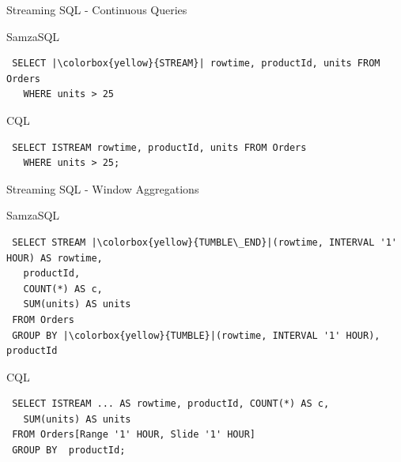 \documentclass[newPxFont]{beamer}
\begin{document}

\begin{frame}[fragile]{Streaming SQL - Continuous Queries}

\begin{alertblock}{SamzaSQL}
 \begin{verbatim}
 SELECT |\colorbox{yellow}{STREAM}| rowtime, productId, units FROM Orders 
   WHERE units > 25
 \end{verbatim}
\end{alertblock}

\begin{exampleblock}{CQL}
 \begin{verbatim}
 SELECT ISTREAM rowtime, productId, units FROM Orders 
   WHERE units > 25;
 \end{verbatim}
\end{exampleblock}
\end{frame}


\begin{frame}[fragile]{Streaming SQL - Window Aggregations}

\begin{alertblock}{SamzaSQL}
 \begin{verbatim}
 SELECT STREAM |\colorbox{yellow}{TUMBLE\_END}|(rowtime, INTERVAL '1' HOUR) AS rowtime,
   productId,
   COUNT(*) AS c,
   SUM(units) AS units
 FROM Orders
 GROUP BY |\colorbox{yellow}{TUMBLE}|(rowtime, INTERVAL '1' HOUR), productId
 \end{verbatim}
\end{alertblock}

\begin{exampleblock}{CQL}
 \begin{verbatim}
 SELECT ISTREAM ... AS rowtime, productId, COUNT(*) AS c, 
   SUM(units) AS units
 FROM Orders[Range '1' HOUR, Slide '1' HOUR]
 GROUP BY  productId;
 \end{verbatim}
\end{exampleblock}

\end{frame}
\end{document}
